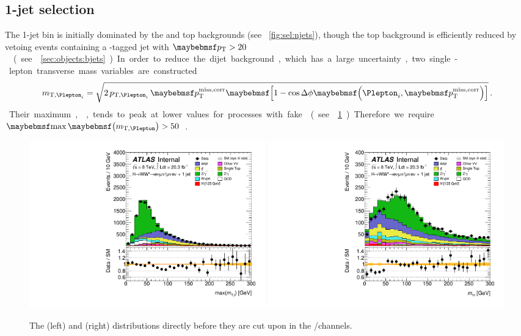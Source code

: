 \subsection{1-jet selection}
\label{sec:selection:1j}

The 1-jet bin is initially dominated by the \DY and top backgrounds (see 
\Figure~\ref{fig:sel:njets}), though the top background is efficiently reduced by vetoing 
events containing a \Pbottom-tagged jet with \unit{$\pt > 20$}{\GeV} (see 
\Section~\ref{sec:objects:bjets}).

In order to reduce the dijet background, which has a large uncertainty, two single-lepton 
transverse mass variables are constructed
\begin{equation}
	m_{\text{T,}\Plepton_i} = \sqrt{2 \, p_{\text{T,}\Plepton_i} \, \corrtrackmet 
	\sqbracs{1 - \cos\Delta\phi\parenths{\Plepton_i, \corrtrackmet}}} \,.
\end{equation}
Their maximum, \maxmtw, tends to peak at lower values for processes with fake \met (see 
\Figure~\ref{fig:sel:1j:df_cuts}). Therefore we require \unit{$\maxmtw > 50$}{\GeV}.

\begin{figure}
	\includegraphics[width=0.495\textwidth]{tex/selection/emme_CutbVeto_1jet_MaxMTW_TrackHWW_Clj_mh125_lin}
	\hfill
	\includegraphics[width=0.495\textwidth]{tex/selection/emme_CutMaxMTlep_1jet_Mtt_TrackHWW_Clj_mh125_lin}
	\caption{The \maxmtw (left) and \mtautau (right) distributions directly 
	before they are cut upon in the \emch/\mech channels.}
	\label{fig:sel:1j:df_cuts}
\end{figure}

